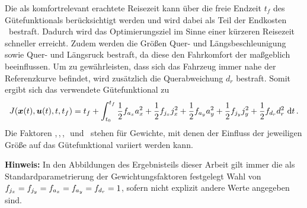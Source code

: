 Die als komfortrelevant erachtete Reisezeit kann über die freie Endzeit $t_f$ des Gütefunktionals berücksichtigt werden und wird dabei als Teil der Endkosten \Vofxoftf~bestraft. Dadurch wird das Optimierungsziel im Sinne einer kürzeren Reisezeit schneller erreicht. Zudem werden die Größen Quer- und Längsbeschleunigung sowie Quer- und Längsruck bestraft, da diese den Fahrkomfort der  maßgeblich beeinflussen. Um zu gewährleisten, dass sich das Fahrzeug immer nahe der Referenzkurve befindet, wird zusätzlich die Querabweichung $d_r$ bestraft. Somit ergibt sich das verwendete Gütefunktional zu
\begin{equation}
	J(\boldsymbol{x}(t),\boldsymbol{u}(t),t,t_f) = t_f + \int_{t_0}^{t_f} \frac{1}{2}f_{a_x} a_x^2 + \frac{1}{2}f_{j_x} j_x^2 + \frac{1}{2}f_{a_y} a_y^2 + \frac{1}{2}f_{j_y} j_y^2 + \frac{1}{2}f_{d_r} d_r^2~\textrm{d}{t}\,. \label{eq:J_eingesetzt}
\end{equation}
Die Faktoren \fax,\,\fjx,\,\fay,\,\fjy~und \fdr~stehen für Gewichte, mit denen der Einfluss der jeweiligen Größe auf das Gütefunktional variiert werden kann. 

\textbf{Hinweis:} In den Abbildungen des Ergebnisteils dieser Arbeit gilt immer die als Standardparametrierung der Gewichtungsfaktoren festgelegt Wahl von $f_{j_x} = f_{j_y} = f_{a_x} = f_{a_y} = f_{d_r} = 1$, sofern nicht explizit andere Werte angegeben sind.
 
